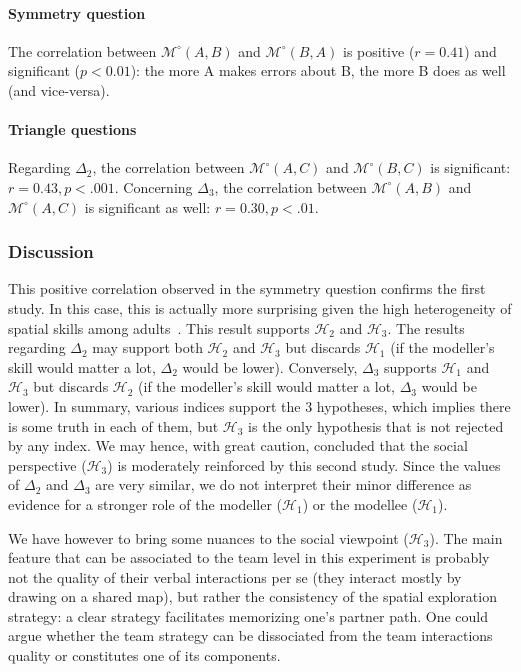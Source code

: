 \documentclass[natbib]{svjour3}
\newcommand{\A}{A\xspace}
\newcommand{\B}{B\xspace}
\newcommand{\gModel}[2]{{$\mathcal{M}^{\circ}(#1, #2)$}}
\begin{document}
\paragraph{Symmetry question} The correlation between \gModel{A}{B}  and
\gModel{B}{A}  is positive ($r = 0.41$) and significant ($p < 0.01$): the more \A
makes errors about \B, the more \B does as well (and vice-versa).

\paragraph{Triangle questions} Regarding $\Delta_2$, the correlation between
\gModel{A}{C} and \gModel{B}{C} is significant: $r=0.43, p <.001$. Concerning
$\Delta_3$, the correlation between \gModel{A}{B} and \gModel{A}{C} is
significant as well: $r=0.30, p <.01$.

\subsubsection*{Discussion}

This positive correlation observed in the symmetry question confirms the first
study.  In this case, this is actually more surprising given  the high
heterogeneity of spatial skills among adults~\citep{liben1981spatial}. This
result supports  $\mathcal{H}_{2}$ and $\mathcal{H}_{3}$. The results regarding
$\Delta_2$ may support both  $\mathcal{H}_{2}$ and  $\mathcal{H}_{3}$  but
discards   $\mathcal{H}_{1}$  (if the modeller's skill would matter a lot,
$\Delta_2$ would be lower). Conversely, $\Delta_3$  supports $\mathcal{H}_{1}$
and  $\mathcal{H}_{3}$ but discards   $\mathcal{H}_{2}$  (if the modeller's
skill would matter a lot,  $\Delta_3$ would be lower). In summary, various
indices support the 3 hypotheses, which implies there is some truth in each of
them, but $\mathcal{H}_{3}$ is the only hypothesis that is not rejected by any
index. We may hence, with great caution, concluded that the social perspective
($\mathcal{H}_{3}$) is moderately reinforced by this second study. Since the
values of $\Delta_2$ and $\Delta_3$ are very similar, we do not interpret their
minor difference as evidence for a stronger role of the modeller
($\mathcal{H}_{1}$) or the modellee ($\mathcal{H}_{1}$).

We have however to bring some nuances to the social viewpoint
($\mathcal{H}_{3}$).  The main feature that can be associated to the team level
in this experiment is probably not the quality of their verbal interactions per
se (they interact mostly by drawing on a shared map), but rather the consistency
of  the spatial exploration strategy: a clear strategy facilitates memorizing
one's partner path.  One could argue whether the team strategy can be
dissociated from the team interactions quality or constitutes one of its
components.
\end{document}
